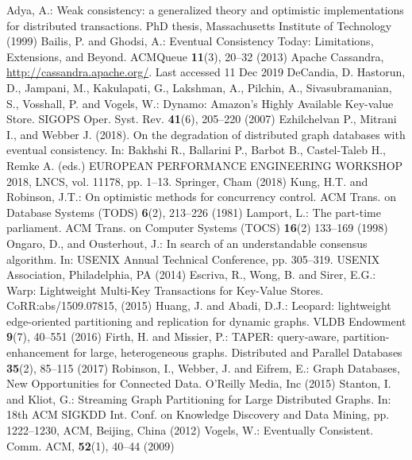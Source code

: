 \documentclass[runningheads]{llncs}
\begin{document}
\begin{thebibliography}{99}
 Adya, A.: Weak consistency: a generalized theory and optimistic
implementations for distributed transactions. PhD thesis, Massachusetts
Institute of Technology (1999)
 Bailis, P. and Ghodsi, A.: Eventual Consistency Today:
  Limitations, Extensions, and Beyond. ACMQueue \textbf{11}(3), 20--32 (2013)
 Apache Cassandra, \url{http://cassandra.apache.org/}. Last accessed 11 Dec 2019
 DeCandia, D. Hastorun, D., Jampani, M., Kakulapati, G.,
Lakshman, A., Pilchin, A., Sivasubramanian, S., Vosshall, P. and Vogels, W.:
Dynamo: Amazon's Highly Available Key-value Store. SIGOPS Oper. Syst. Rev.
\textbf{41}(6), 205--220 (2007)
 Ezhilchelvan P., Mitrani I., and Webber J. (2018). On the degradation of distributed graph databases with eventual consistency. In: Bakhshi R., Ballarini P., Barbot B., Castel-Taleb H., Remke A. (eds.) EUROPEAN PERFORMANCE ENGINEERING WORKSHOP 2018, LNCS, vol. 11178, pp. 1--13. Springer, Cham (2018)
 Kung, H.T. and Robinson, J.T.: On optimistic methods for
  concurrency control. ACM Trans. on Database Systems (TODS) \textbf{6}(2), 213--226 (1981)
 Lamport, L.: The part-time parliament. ACM Trans. on Computer
  Systems (TOCS) \textbf{16}(2) 133--169 (1998)
 Ongaro, D., and Ousterhout, J.: In search of an understandable
  consensus algorithm. In: USENIX Annual Technical Conference, pp. 305--319. USENIX Association, Philadelphia, PA (2014)
 Escriva, R., Wong, B. and Sirer, E.G.: Warp: Lightweight Multi-Key
Transactions for Key-Value Stores. CoRR:abs/1509.07815, (2015)
 Huang, J. and Abadi, D.J.: Leopard: lightweight edge-oriented
partitioning and replication for dynamic graphs. VLDB Endowment \textbf{9}(7), 40--551 (2016)
 Firth, H. and Missier, P.: TAPER: query-aware, partition-enhancement
for large, heterogeneous graphs. Distributed and Parallel Databases \textbf{35}(2), 85--115 (2017)
 Robinson, I., Webber, J. and Eifrem, E.: Graph Databases, New
Opportunities for Connected Data. O'Reilly Media, Inc (2015)
 Stanton, I. and Kliot, G.: Streaming Graph Partitioning for Large
Distributed Graphs. In: 18th ACM SIGKDD Int. Conf. on Knowledge Discovery
and Data Mining, pp. 1222--1230, ACM, Beijing, China (2012)
 Vogels, W.: Eventually Consistent. Comm. ACM, \textbf{52}(1), 40--44 (2009)
\end{thebibliography}
\end{document}
